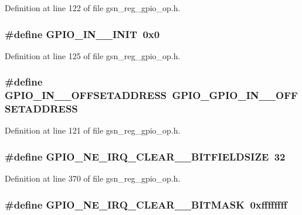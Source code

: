 Definition at line 122 of file gsn\_\-reg\_\-gpio\_\-op.h.

\hypertarget{a00553_abce32a9f2c9bfae4fa3bf69ff132414f}{
\subsubsection[{GPIO\_\-IN\_\-1\_\-INIT}]{\setlength{\rightskip}{0pt plus 5cm}\#define GPIO\_\-IN\_\_\-INIT~0x0}}
\label{a00553_abce32a9f2c9bfae4fa3bf69ff132414f}


Definition at line 125 of file gsn\_\-reg\_\-gpio\_\-op.h.

\hypertarget{a00553_a9b13e393460a103b2c968d4e5bfeb75b}{
\subsubsection[{GPIO\_\-IN\_\-1\_\-OFFSETADDRESS}]{\setlength{\rightskip}{0pt plus 5cm}\#define GPIO\_\-IN\_\_\-OFFSETADDRESS~GPIO\_\-GPIO\_\-IN\_\_\-OFFSETADDRESS}}
\label{a00553_a9b13e393460a103b2c968d4e5bfeb75b}


Definition at line 121 of file gsn\_\-reg\_\-gpio\_\-op.h.

\hypertarget{a00553_af1c0be2efac66cd3c09ce9e2b994190e}{
\subsubsection[{GPIO\_\-NE\_\-IRQ\_\-CLEAR\_\-0\_\-BITFIELDSIZE}]{\setlength{\rightskip}{0pt plus 5cm}\#define GPIO\_\-NE\_\-IRQ\_\-CLEAR\_\_\-BITFIELDSIZE~32}}
\label{a00553_af1c0be2efac66cd3c09ce9e2b994190e}


Definition at line 370 of file gsn\_\-reg\_\-gpio\_\-op.h.

\hypertarget{a00553_ad7453c86198e17bbbfd1e2b9add0a5df}{
\subsubsection[{GPIO\_\-NE\_\-IRQ\_\-CLEAR\_\-0\_\-BITMASK}]{\setlength{\rightskip}{0pt plus 5cm}\#define GPIO\_\-NE\_\-IRQ\_\-CLEAR\_\_\-BITMASK~0xffffffff}}
\label{a00553_ad7453c86198e17bbbfd1e2b9add0a5df}


